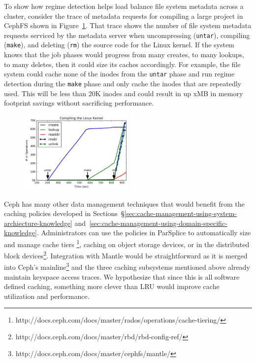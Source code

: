 To show how regime detection helps load balance file system metadata across a
cluster, consider the trace of metadata requests for compiling a large project
in CephFS shown in Figure~\ref{fig:compile-ops}. That trace shows the number of
file system metadata requests serviced by the metadata server when
uncompressing (\texttt{untar}), compiling (\texttt{make}), and deleting
(\texttt{rm}) the source code for the Linux kernel. If the system knows that
the job phases would progress from many creates, to many lookups, to many
deletes, then it could size its caches accordingly. For example, the file
system could cache none of the inodes from the \texttt{untar} phase and run
regime detection during the \texttt{make} phase and only cache the inodes that
are repeatedly used. This will be less than 20K inodes and could result in up
xMB in memory footprint savings without sacrificing performance.

\begin{figure}[t]
  \noindent\includegraphics[width=0.5\textwidth]{figures/compile-ops.png}\\
\caption{ \label{fig:compile-ops}} \end{figure}

Ceph has many other data management techniques that would benefit from the
caching policies developed in
Sections~\S\ref{sec:cache-management-using-system-archiecture-knowledge}
and~\ref{sec:cache-management-using-domain-specific-knowledge}. Administrators
can use the policies in ParSplice to automatically size and manage cache tiers
\footnote{http://docs.ceph.com/docs/master/rados/operations/cache-tiering/}, caching on
object storage devices, or in the distributed block
devices\footnote{http://docs.ceph.com/docs/master/rbd/rbd-config-ref/}.
Integration with Mantle would be straightforward as it is merged into Ceph's
mainline\footnote{http://docs.ceph.com/docs/master/cephfs/mantle/} and the
three caching subsystems mentioned above already maintain keyspace access
traces. We hypothesize that since this is all software defined caching,
something more clever than LRU would improve cache utilization and performance.

